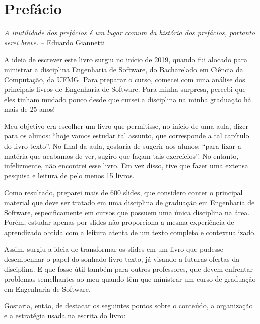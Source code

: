 \documentclass[
  11pt,
  twoside]{book}
\renewenvironment{quote}{\centering \vspace{1.5ex} \begin{tcolorbox}[colback=backcolor, width=4.9in]}{\end{tcolorbox}}
\begin{document}
\mainmatter
\frontmatter

\hypertarget{prefuxe1cio}{%
\chapter*{Prefácio}\label{prefuxe1cio}}

\begin{quote}
\emph{A inutilidade dos prefácios é um lugar comum da história dos
prefácios, portanto serei breve.} -- Eduardo Giannetti
\end{quote}

A ideia de escrever este livro surgiu no início de 2019, quando fui
alocado para ministrar a disciplina Engenharia de Software, do
Bacharelado em Ciência da Computação, da UFMG. Para preparar o curso,
comecei com uma análise dos principais livros de Engenharia de Software.
Para minha surpresa, percebi que eles tinham mudado pouco desde que
cursei a disciplina na minha graduação há mais de 25 anos!

Meu objetivo era escolher um livro que permitisse, no início de uma
aula, dizer para os alunos: ``hoje vamos estudar tal assunto, que
corresponde a tal capítulo do livro-texto''. No final da aula, gostaria
de sugerir aos alunos: ``para fixar a matéria que acabamos de ver,
sugiro que façam tais exercícios''. No entanto, infelizmente, não
encontrei esse livro. Em vez disso, tive que fazer uma extensa pesquisa
e leitura de pelo menos 15 livros.

Como resultado, preparei mais de 600 slides, que considero conter o
principal material que deve ser tratado em uma disciplina de graduação
em Engenharia de Software, especificamente em cursos que possuem uma
única disciplina na área. Porém, estudar apenas por slides não
proporciona a mesma experiência de aprendizado obtida com a leitura
atenta de um texto completo e contextualizado.

Assim, surgiu a ideia de transformar os slides em um livro que pudesse
desempenhar o papel do sonhado livro-texto, já visando a futuras ofertas
da disciplina. E que fosse útil também para outros professores, que
devem enfrentar problemas semelhantes ao meu quando têm que ministrar um
curso de graduação em Engenharia de Software.

Gostaria, então, de destacar os seguintes pontos sobre o conteúdo, a
organização e a estratégia usada na escrita do livro:
\end{document}
